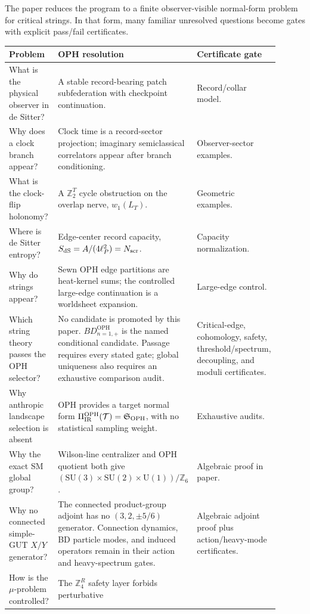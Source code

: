 \documentclass[11pt]{article}
\theoremstyle{remark}
\theoremstyle{plain}
\newcommand{\OPH}{\mathrm{OPH}}
\newcommand{\SU}{\mathrm{SU}}
\newcommand{\U}{\mathrm{U}}
\newcommand{\Z}{\mathbb Z}
\newcommand{\ZfourR}{\mathbb Z_4^R}
\begin{document}
The paper reduces the program to a finite observer-visible normal-form problem for critical strings.
In that form, many familiar unresolved questions become gates with explicit pass/fail certificates.

\begin{longtable}{p{0.27\linewidth}p{0.43\linewidth}p{0.20\linewidth}}
\toprule
\textbf{Problem} & \textbf{OPH resolution} & \textbf{Certificate gate} \\
\midrule
What is the physical observer in de Sitter? & A stable record-bearing patch subfederation with
checkpoint continuation. & Record/collar model. \\
Why does a clock branch appear? & Clock time is a record-sector projection; imaginary
semiclassical correlators appear after branch conditioning. & Observer-sector examples. \\
What is the clock-flip holonomy? & A \(\Z_2^T\) cycle obstruction on the overlap nerve,
\(w_1(L_T)\). & Geometric examples. \\
Where is de Sitter entropy? & Edge-center record capacity,
\(S_{\rm dS}=A/(4\ell_P^2)=N_{\rm scr}\). & Capacity normalization. \\
Why do strings appear? & Sewn OPH edge partitions are heat-kernel sums; the controlled
large-edge continuation is a worldsheet expansion. & Large-edge control. \\
Which string theory passes the OPH selector? & No candidate is promoted by this paper.
\(BD_{n=1,+}^{\OPH}\) is the named conditional candidate. Passage requires every stated gate;
global uniqueness also requires an exhaustive comparison audit. & Critical-edge, cohomology,
safety, threshold/spectrum, decoupling, and moduli certificates. \\
Why anthropic landscape selection is absent & OPH provides a target normal form
\(\Pi_{\rm IR}^{\OPH}(\mathcal T)=\mathfrak S_{\OPH}\), with no statistical sampling weight. & Exhaustive audits. \\
Why the exact SM global group? & Wilson-line centralizer and OPH quotient both give
\((\SU(3)\times\SU(2)\times\U(1))/\Z_6\). & Algebraic proof in paper. \\
Why no connected simple-GUT \(X/Y\) generator? & The connected product-group adjoint has no
\((3,2,\pm5/6)\) generator. Connection dynamics, BD particle modes, and induced operators remain
in their action and heavy-spectrum gates. & Algebraic adjoint proof plus action/heavy-mode certificates. \\
How is the \(\mu\)-problem controlled? & The \(\ZfourR\) safety layer forbids perturbative

\end{longtable}
\end{document}
